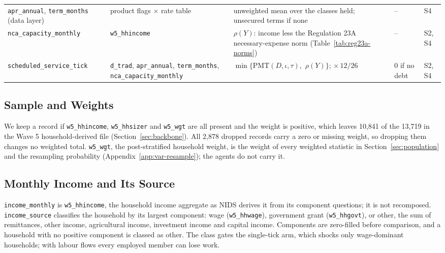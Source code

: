 \begin{longtable}{H{3.0cm}H{3.2cm}L{3.8cm}L{2.0cm}L{1.3cm}}
\addlinespace
\texttt{apr\_annual}, \texttt{term\_months} (data layer) & product flags $\times$ rate table & unweighted mean over the classes held; unsecured terms if none & -- & S4 \\
\addlinespace
\texttt{nca\_capacity\_monthly} & \texttt{w5\_hhincome} & $\rho(Y)$: income less the Regulation 23A necessary-expense norm (Table~\ref{tab:reg23a-norms}) & -- & S2, S4 \\
\addlinespace
\texttt{scheduled\_\allowbreak service\_\allowbreak tick} & \texttt{d\_trad}, \texttt{apr\_annual}, \texttt{term\_months}, \texttt{nca\_capacity\_\allowbreak monthly} & $\min\{\mathrm{PMT}(D, \iota, \tau),$ $\rho(Y)\}$; $\times\,12/26$ & 0 if no debt & S2, S4 \\
\end{longtable}
\endgroup

\subsection{Sample and Weights}\label{app:var-sample}

We keep a record if \texttt{w5\_hhincome}, \texttt{w5\_hhsizer} and \texttt{w5\_wgt} are all
present and the weight is positive, which leaves 10{,}841 of the 13{,}719 in the Wave 5
household-derived file (Section~\ref{sec:backbone}). All 2{,}878 dropped records carry a zero or
missing weight, so dropping them changes no weighted total. \texttt{w5\_wgt}, the post-stratified
household weight, is the weight of every weighted statistic in Section~\ref{sec:population} and
the resampling probability (Appendix~\ref{app:var-resample}); the agents do not carry it.

\subsection{Monthly Income and Its Source}\label{app:var-income}

\texttt{income\_monthly} is \texttt{w5\_hhincome}, the household income aggregate as \ac{NIDS}
derives it from its component questions; it is not recomposed. \texttt{income\_source} classifies
the household by its largest component: wage (\texttt{w5\_hhwage}), government grant
(\texttt{w5\_hhgovt}), or other, the sum of remittances, other income, agricultural income,
investment income and capital income. Components are zero-filled before comparison, and a
household with no positive component is classed as other. The class gates the single-tick arm,
which shocks only wage-dominant households; with labour flows every employed member can lose work.

